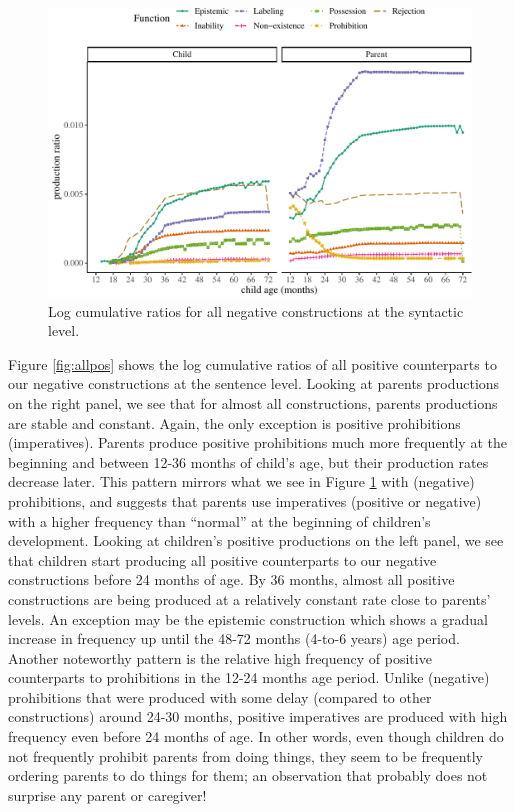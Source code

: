 \documentclass[
  english,
  man,floatsintext]{apa6}
\begin{document}
\begin{figure}[H]

{\centering \includegraphics{neg_construction_article_files/figure-latex/allneg-1} 

}

\caption{Log cumulative ratios for all negative constructions at the syntactic level.}\label{fig:allneg}
\end{figure}

Figure \ref{fig:allpos} shows the log cumulative ratios of all positive counterparts to our negative constructions at the sentence level. Looking at parents productions on the right panel, we see that for almost all constructions, parents productions are stable and constant. Again, the only exception is positive prohibitions (imperatives). Parents produce positive prohibitions much more frequently at the beginning and between 12-36 months of child's age, but their production rates decrease later. This pattern mirrors what we see in Figure \ref{fig:allneg} with (negative) prohibitions, and suggests that parents use imperatives (positive or negative) with a higher frequency than ``normal'' at the beginning of children's development. Looking at children's positive productions on the left panel, we see that children start producing all positive counterparts to our negative constructions before 24 months of age. By 36 months, almost all positive constructions are being produced at a relatively constant rate close to parents' levels. An exception may be the epistemic construction which shows a gradual increase in frequency up until the 48-72 months (4-to-6 years) age period. Another noteworthy pattern is the relative high frequency of positive counterparts to prohibitions in the 12-24 months age period. Unlike (negative) prohibitions that were produced with some delay (compared to other constructions) around 24-30 months, positive imperatives are produced with high frequency even before 24 months of age. In other words, even though children do not frequently prohibit parents from doing things, they seem to be frequently ordering parents to do things for them; an observation that probably does not surprise any parent or caregiver!
\end{document}
